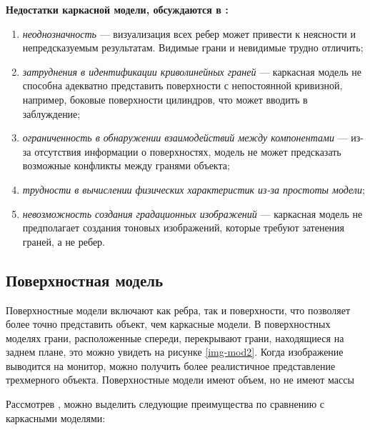 \textbf{Недостатки каркасной модели, обсуждаются в \cite{model_geom_01}:}
\begin{enumerate}
      \item \textit{неоднозначность} --- визуализация всех ребер может привести к неясности и непредсказуемым результатам. Видимые грани и невидимые трудно отличить;
      \item \textit{затруднения в идентификации криволинейных граней} --- каркасная модель не способна адекватно представить поверхности с непостоянной кривизной, например, боковые поверхности цилиндров, что может вводить в заблуждение;
      \item \textit{ограниченность в обнаружении взаимодействий между компонентами} --- из-за отсутствия информации о поверхностях, модель не может предсказать возможные конфликты между гранями объекта; 
    		
    \item \textit{трудности в вычислении физических характеристик из-за простоты модели};
   	\item \textit{невозможность создания градационных изображений} --- каркасная модель не предполагает создания тоновых изображений, которые требуют затенения граней, а не ребер.
\end{enumerate}
   

  

\subsection{Поверхностная модель}

Поверхностные модели включают как ребра, так и поверхности, что позволяет более точно представить объект, чем каркасные модели. В поверхностных моделях грани, расположенные спереди, перекрывают грани, находящиеся на заднем плане, это можно увидеть на рисунке \ref{img-mod2}. Когда изображение выводится на монитор, можно получить более реалистичное представление трехмерного объекта. Поверхностные модели имеют объем, но не имеют массы \cite{model_geom}


Рассмотрев \cite{model_geom_01}, можно выделить следующие преимущества по сравнению с каркасными моделями:


